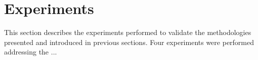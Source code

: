 \section{ Experiments }

This section describes the experiments performed to validate the methodologies presented and introduced in previous sections. Four experiments were performed addressing the ...

